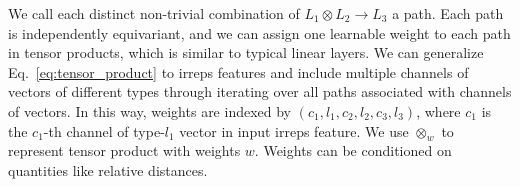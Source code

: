 We call each distinct non-trivial combination of $L_1 \otimes L_2 \rightarrow L_3$ a path.
Each path is independently equivariant, and we can assign one learnable weight to each path in tensor products, which is similar to typical linear layers.
We can generalize Eq.~\ref{eq:tensor_product} to irreps features and include multiple channels of vectors of different types through iterating over all paths associated with channels of vectors.
In this way, weights are indexed by $(c_1, l_1, c_2, l_2, c_3, l_3)$, where $c_1$ is the $c_1$-th channel of type-$l_1$ vector in input irreps feature.
We use $\otimes_{w}$ to represent tensor product with weights $w$. %
Weights can be conditioned on quantities like relative distances.



